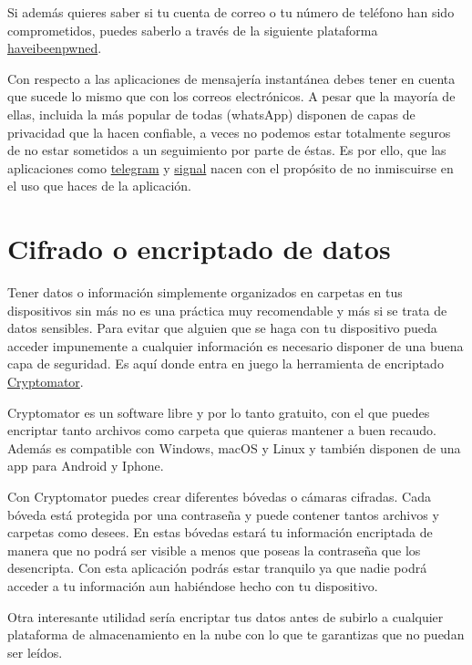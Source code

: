 \documentclass[
  a4paper,
  openany]{book}
\begin{document}
Si además quieres saber si tu cuenta de correo o tu número de teléfono han sido comprometidos, puedes saberlo a través de la siguiente plataforma \href{https://haveibeenpwned.com/}{haveibeenpwned}.

Con respecto a las aplicaciones de mensajería instantánea debes tener en cuenta que sucede lo mismo que con los correos electrónicos. A pesar que la mayoría de ellas, incluida la más popular de todas (whatsApp) disponen de capas de privacidad que la hacen confiable, a veces no podemos estar totalmente seguros de no estar sometidos a un seguimiento por parte de éstas. Es por ello, que las aplicaciones como \href{https://telegram.org/}{telegram} y \href{https://signal.org/es/}{signal} nacen con el propósito de no inmiscuirse en el uso que haces de la aplicación.

\hypertarget{cifrado-o-encriptado-de-datos}{%
\section{Cifrado o encriptado de datos}\label{cifrado-o-encriptado-de-datos}}

Tener datos o información simplemente organizados en carpetas en tus dispositivos sin más no es una práctica muy recomendable y más si se trata de datos sensibles. Para evitar que alguien que se haga con tu dispositivo pueda acceder impunemente a cualquier información es necesario disponer de una buena capa de seguridad. Es aquí donde entra en juego la herramienta de encriptado \href{https://cryptomator.org/}{Cryptomator}.

Cryptomator es un software libre y por lo tanto gratuito, con el que puedes encriptar tanto archivos como carpeta que quieras mantener a buen recaudo. Además es compatible con Windows, macOS y Linux y también disponen de una app para Android y Iphone.

Con Cryptomator puedes crear diferentes bóvedas o cámaras cifradas. Cada bóveda está protegida por una contraseña y puede contener tantos archivos y carpetas como desees. En estas bóvedas estará tu información encriptada de manera que no podrá ser visible a menos que poseas la contraseña que los desencripta. Con esta aplicación podrás estar tranquilo ya que nadie podrá acceder a tu información aun habiéndose hecho con tu dispositivo.

Otra interesante utilidad sería encriptar tus datos antes de subirlo a cualquier plataforma de almacenamiento en la nube con lo que te garantizas que no puedan ser leídos.
\end{document}

